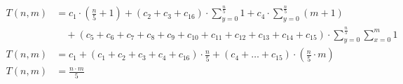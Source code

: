\begin{subequations}
\begin{align}
\label{eq:findedgels1}
T(n,m)& =
c_1 \cdot (\frac{n}{5} + 1) + (c_2 + c_3 + c_{16}) \cdot \sum_{y=0}^{\frac{n}{5}} 1
 + c_4 \cdot \sum_{y=0}^{\frac{n}{5}} (m+1) \\
& \quad + (c_5 + c_6 + c_7 + c_8 + c_9 + c_{10} + c_{11} + c_{12} + c_{13} + c_{14} + c_{15})
 \cdot \sum_{y=0}^{\frac{n}{5}} \sum_{x=0}^{m} 1 \nonumber \\
\label{eq:findedgels2}
T(n,m)& = c_1 + (c_1 + c_2 + c_3 + c_4 + c_{16}) \cdot \frac{n}{5} + (c_4 + \ldots + c_{15})
\cdot (\frac{n}{5} \cdot m) \\
\label{eq:findedgels3}
T(n,m)& = \frac{n \cdot m}{5}
\end{align}
\end{subequations}